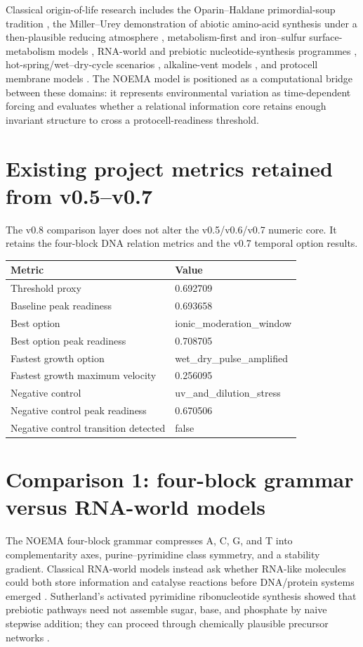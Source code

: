\documentclass[11pt]{article}
\begin{document}
Classical origin-of-life research includes the Oparin--Haldane primordial-soup tradition \cite{Oparin1938,Haldane1929}, the Miller--Urey demonstration of abiotic amino-acid synthesis under a then-plausible reducing atmosphere \cite{Miller1953}, metabolism-first and iron--sulfur surface-metabolism models \cite{Wachtershauser1988}, RNA-world and prebiotic nucleotide-synthesis programmes \cite{PownerGerlandSutherland2009,RobertsonJoyce2012}, hot-spring/wet--dry-cycle scenarios \cite{DamerDeamer2015,DamerDeamer2020}, alkaline-vent models \cite{MartinRussell2003,MartinBarossKelleyRussell2008}, and protocell membrane models \cite{Mansy2008Protocells}. The NOEMA model is positioned as a computational bridge between these domains: it represents environmental variation as time-dependent forcing and evaluates whether a relational information core retains enough invariant structure to cross a protocell-readiness threshold.

\section{Existing project metrics retained from v0.5--v0.7}
The v0.8 comparison layer does not alter the v0.5/v0.6/v0.7 numeric core. It retains the four-block DNA relation metrics and the v0.7 temporal option results.

\begin{longtable}{@{}ll@{}}
\toprule
Metric & Value \\
\midrule
Threshold proxy & 0.692709 \\
Baseline peak readiness & 0.693658 \\
Best option & ionic_moderation_window \\
Best option peak readiness & 0.708705 \\
Fastest growth option & wet_dry_pulse_amplified \\
Fastest growth maximum velocity & 0.256095 \\
Negative control & uv_and_dilution_stress \\
Negative control peak readiness & 0.670506 \\
Negative control transition detected & false \\
\bottomrule
\end{longtable}

\section{Comparison 1: four-block grammar versus RNA-world models}
The NOEMA four-block grammar compresses A, C, G, and T into complementarity axes, purine--pyrimidine class symmetry, and a stability gradient. Classical RNA-world models instead ask whether RNA-like molecules could both store information and catalyse reactions before DNA/protein systems emerged \cite{RobertsonJoyce2012}. Sutherland's activated pyrimidine ribonucleotide synthesis showed that prebiotic pathways need not assemble sugar, base, and phosphate by naive stepwise addition; they can proceed through chemically plausible precursor networks \cite{PownerGerlandSutherland2009}.
\end{document}
